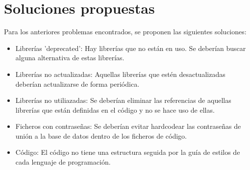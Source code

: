 \section{Soluciones propuestas}

Para los anteriores problemas encontrados, se proponen las siguientes soluciones:

\begin{itemize}
     \item Librerías 'deprecated': Hay librerías que no están en uso. Se deberían buscar alguna alternativa de estas librerías.
    \item Librerías no actualizadas: Aquellas librerías que estén desactualizadas deberían actualizarse de forma periódica.
    \item Librerías no utiliazadas: Se deberían eliminar las referencias de aquellas librerías que están definidas en el código y no se hace uso de ellas.
    \item Ficheros con contraseñas: Se deberían evitar hardcodear las contraseñas de unión a la base de datos dentro de los ficheros de código.
    \item Código: El código no tiene una estructura seguida por la guía de estilos de cada lenguaje de programación.
\end{itemize}






